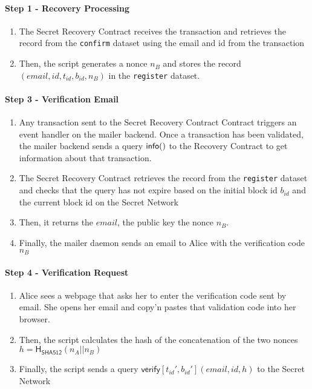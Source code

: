 \documentclass[12pt]{article}
\newcommand{\ms}[1]{\ensuremath{\mathsf{#1}}}
\newcommand{\tx}[3]{\ms{#1}[#2](#3)}
\newcommand{\qry}[3]{\ms{#1}(#3)}
\begin{document}
\paragraph{Step 1 - Recovery Processing}

\begin{enumerate}[label=2.\arabic*]
    \item The Secret Recovery Contract receives the transaction and retrieves the record from the {\tt confirm} dataset using the email and id from the transaction
    \item Then, the script generates a nonce $n_B$ and stores the record $(email, id, t_{id}, b_{id}, n_B)$ in the {\tt register} dataset.
\end{enumerate}

\paragraph{Step 3 - Verification Email}

\begin{enumerate}[label=3.\arabic*]
  \item Any transaction sent to the Secret Recovery Contract Contract triggers an event handler on the mailer backend. Once a transaction has been validated, the mailer backend sends a query $\qry{info}{t_id}$ to the Recovery Contract to get information about that transaction.
  \item The Secret Recovery Contract retrieves the record from the {\tt register} dataset and checks that the query has not expire based on the initial block id $b_{id}$ and the current block id on the Secret Network
  \item Then, it returns the $email$, the public key the nonce $n_B$.
  \item Finally, the mailer daemon sends an email to Alice with the verification code $n_B$
\end{enumerate}

\paragraph{{\bf Step 4} - Verification Request}

\begin{enumerate}[label=4.\arabic*]
  \item Alice sees a webpage that asks her to enter the verification code sent by email. She opens her email and copy'n pastes that validation code into her browser.
  \item Then, the script calculates the hash of the concatenation of the two nonces $h=\ms{H_{\ms{SHA512}}}(n_A || n_B)$
  \item Finally, the script sends a query $\tx{verify}{t_{id}', b_{id}'}{email, id, h}$ to the Secret Network
\end{enumerate}
\end{document}
